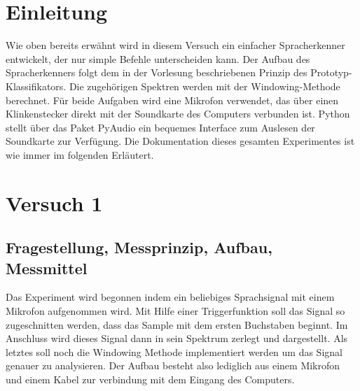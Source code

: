 \documentclass[12pt, oneside, a4paper, \docLanguage]{report}
\begin{document}

\setcounter{section}{0}



\clearpage

%
%


%
%


%
%
%

%
%




\setcounter{page}{1}
\pagestyle{default}
%
%
\chapter{Einleitung}
\label{chap:EINL}
\begin{normalsize}
Wie oben bereits erwähnt wird in diesem Versuch ein einfacher Spracherkenner entwickelt, der nur simple Befehle unterscheiden kann.
Der Aufbau des Spracherkenners folgt
dem in der Vorlesung beschriebenen Prinzip des Prototyp-Klassifikators. Die zugehörigen
Spektren werden mit der Windowing-Methode berechnet.\newline
Für beide Aufgaben wird eine Mikrofon verwendet, das über einen Klinkenstecker direkt
mit der Soundkarte des Computers verbunden ist. Python stellt über das Paket PyAudio ein
bequemes Interface zum Auslesen der Soundkarte zur Verfügung.\newline
Die Dokumentation dieses gesamten Experimentes ist wie immer im folgenden Erläutert.
\end{normalsize}

%
%
\chapter{Versuch 1}
\label{chap:VERSUCH_1}

\section{Fragestellung, Messprinzip, Aufbau, Messmittel}
\label{chap:VERSUCH_1_FRAGESTELLUNG}
Das Experiment wird begonnen indem ein beliebiges Sprachsignal mit einem Mikrofon aufgenommen wird.
Mit Hilfe einer Triggerfunktion soll das Signal so zugeschnitten werden, dass das Sample mit dem ersten Buchstaben beginnt.
Im Anschluss wird dieses Signal dann in sein Spektrum zerlegt und dargestellt.
Als letztes soll noch die Windowing Methode implementiert werden um das Signal genauer zu analysieren.
Der Aufbau besteht also lediglich aus einem Mikrofon und einem Kabel zur verbindung mit dem Eingang des Computers.
\end{document}
